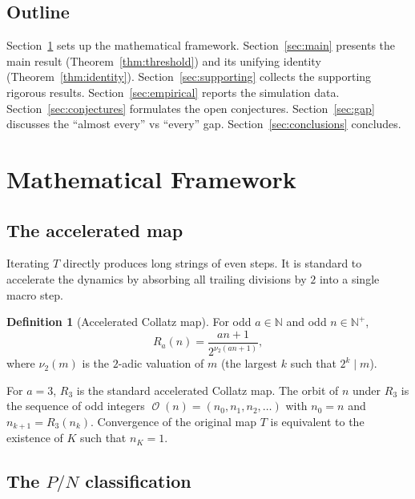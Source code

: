 \documentclass[12pt,reqno]{amsart}
\theoremstyle{plain}
\theoremstyle{definition}
\newtheorem{definition}[theorem]{Definition}
\newcommand{\N}{\mathbb{N}}
\newcommand{\nuTwo}{\nu_2}
\DeclareMathOperator{\Orb}{\mathcal{O}}
\begin{document}
\subsection*{Outline}
Section~\ref{sec:framework} sets up the mathematical framework.
Section~\ref{sec:main} presents the main result (Theorem~\ref{thm:threshold})
and its unifying identity (Theorem~\ref{thm:identity}).
Section~\ref{sec:supporting} collects the supporting rigorous results.
Section~\ref{sec:empirical} reports the simulation data.
Section~\ref{sec:conjectures} formulates the open conjectures.
Section~\ref{sec:gap} discusses the ``almost every'' vs ``every'' gap.
Section~\ref{sec:conclusions} concludes.

\section{Mathematical Framework}\label{sec:framework}

\subsection{The accelerated map}

Iterating $T$ directly produces long strings of even steps. It is standard to
accelerate the dynamics by absorbing all trailing divisions by $2$ into a single
macro step.

\begin{definition}[Accelerated Collatz map]\label{def:accelerated}
For odd $a \in \N$ and odd $n \in \N^+$,
\begin{equation}\label{eq:accelerated}
R_a(n) = \frac{an + 1}{2^{\nuTwo(an+1)}},
\end{equation}
where $\nuTwo(m)$ is the $2$-adic valuation of $m$ (the largest $k$ such that $2^k \mid m$).
\end{definition}

For $a=3$, $R_3$ is the standard accelerated Collatz map.
The orbit of $n$ under $R_3$ is the sequence of odd integers
$\Orb(n) = (n_0, n_1, n_2, \dots)$ with $n_0 = n$ and $n_{k+1} = R_3(n_k)$.
Convergence of the original map $T$ is equivalent to the existence of $K$ such
that $n_K = 1$.

\subsection{The $P/N$ classification}
\end{document}
